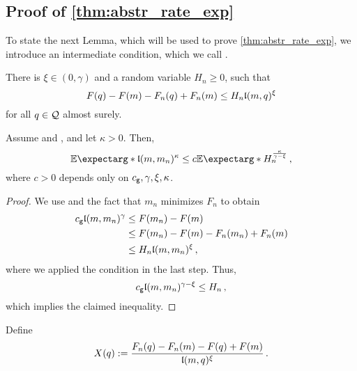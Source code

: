 \subsection{Proof of \autoref{thm:abstr_rate_exp}}
%
To state the next Lemma, which will be used to prove \autoref{thm:abstr_rate_exp}, we introduce an intermediate condition, which we call .
%
\begin{assumptions}
\theoremContentInNewLine
\begin{enumerate}[label=\environmentEnumerateLabel]
	There is $\xi \in (0, \gamma)$ and a random variable $H_n \geq 0$, such that
	\begin{equation}
		F(q) - F(m) - F_n(q) + F_n(m) \leq H_n \mathfrak{l}(m, q)^\xi
	\end{equation}
	for all $q \in \mathcal{Q}$ almost surely.
\end{enumerate}
\end{assumptions}
%
\begin{lemma}\label{lmm:strong:growth}
	Assume  and , and let $\kappa > 0$. Then, 
	\begin{equation*}
		\Ex*{\mf l(m,m_n)^{\kappa}} \leq c \Ex*{H_n^{\frac{\kappa}{\gamma-\xi}}}\eqcm
	\end{equation*}
	where $c >0$ depends only on $c_{\mathsf{g}}, \gamma, \xi, \kappa$.
\end{lemma}
%
\begin{proof}
	We use  and the fact that $m_n$ minimizes $F_n$ to obtain
	\begin{align*}
		c_{\mathsf{g}}\mathfrak{l}(m,m_n)^\gamma 
		&\leq
		F(m_n)-F(m)
		\\&\leq
		F(m_n)-F(m)-F_n(m_n)+F_n(m)
		\\&\leq
		H_n \mathfrak{l}(m, m_n)^\xi
		\, ,
	\end{align*}
	where we applied the  condition in the last step. Thus,
	\begin{equation*}
		c_{\mathsf{g}} \mathfrak{l} (m,m_n)^{\gamma-\xi} \leq H_n\, ,
	\end{equation*}
	which implies the claimed inequality.
\end{proof}
%
Define
\begin{equation*}
	X(q) :=  \frac{F_n(q)-F_n(m)-F(q)+F(m)}{\mathfrak{l}(m, q)^\xi}\, .
\end{equation*}
%

